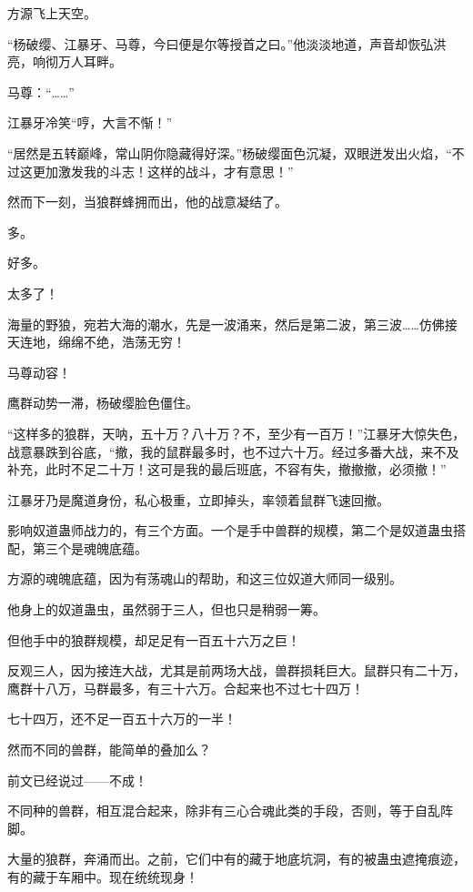 
\begin{this_body}

方源飞上天空。

“杨破缨、江暴牙、马尊，今曰便是尔等授首之曰。”他淡淡地道，声音却恢弘洪亮，响彻万人耳畔。

马尊：“……”

江暴牙冷笑“哼，大言不惭！”

“居然是五转巅峰，常山阴你隐藏得好深。”杨破缨面色沉凝，双眼迸发出火焰，“不过这更加激发我的斗志！这样的战斗，才有意思！”

然而下一刻，当狼群蜂拥而出，他的战意凝结了。

多。

好多。

太多了！

海量的野狼，宛若大海的潮水，先是一波涌来，然后是第二波，第三波……仿佛接天连地，绵绵不绝，浩荡无穷！

马尊动容！

鹰群动势一滞，杨破缨脸色僵住。

“这样多的狼群，天呐，五十万？八十万？不，至少有一百万！”江暴牙大惊失色，战意暴跌到谷底，“撤，我的鼠群最多时，也不过六十万。经过多番大战，来不及补充，此时不足二十万！这可是我的最后班底，不容有失，撤撤撤，必须撤！”

江暴牙乃是魔道身份，私心极重，立即掉头，率领着鼠群飞速回撤。

影响奴道蛊师战力的，有三个方面。一个是手中兽群的规模，第二个是奴道蛊虫搭配，第三个是魂魄底蕴。

方源的魂魄底蕴，因为有荡魂山的帮助，和这三位奴道大师同一级别。

他身上的奴道蛊虫，虽然弱于三人，但也只是稍弱一筹。

但他手中的狼群规模，却足足有一百五十六万之巨！

反观三人，因为接连大战，尤其是前两场大战，兽群损耗巨大。鼠群只有二十万，鹰群十八万，马群最多，有三十六万。合起来也不过七十四万！

七十四万，还不足一百五十六万的一半！

然而不同的兽群，能简单的叠加么？

前文已经说过——不成！

不同种的兽群，相互混合起来，除非有三心合魂此类的手段，否则，等于自乱阵脚。

大量的狼群，奔涌而出。之前，它们中有的藏于地底坑洞，有的被蛊虫遮掩痕迹，有的藏于车厢中。现在统统现身！


\end{this_body}
